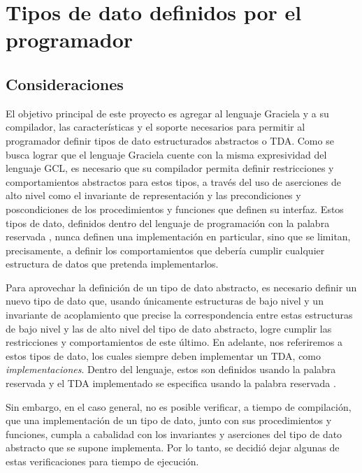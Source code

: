 {{%
\section{Tipos de dato definidos por el programador}


\subsection{Consideraciones}

El objetivo principal de este proyecto es agregar al lenguaje Graciela y a su
compilador, las características y el soporte necesarios para permitir al
programador definir tipos de dato estructurados abstractos o TDA. Como se busca
lograr que el lenguaje Graciela cuente con la misma expresividad del lenguaje
GCL, es necesario que su compilador permita definir restricciones y
comportamientos abstractos para estos tipos, a través del uso de aserciones de
alto nivel como el invariante de representación y las precondiciones y
poscondiciones de los procedimientos y funciones que definen su interfaz.
Estos tipos de dato, definidos dentro del lenguaje de programación con la
palabra reservada , nunca definen una implementación en
particular, sino que se limitan, precisamente, a definir los comportamientos que
debería cumplir cualquier estructura de datos que pretenda implementarlos.

Para aprovechar la definición de un tipo de dato abstracto, es necesario definir
un nuevo tipo de dato que, usando únicamente estructuras de bajo nivel y un
invariante de acoplamiento que precise la correspondencia entre estas
estructuras de bajo nivel y las de alto nivel del tipo de dato abstracto, logre
cumplir las restricciones y comportamientos de este último. En adelante, nos
referiremos a estos tipos de dato, los cuales siempre deben implementar un TDA,
como \textit{implementaciones}. Dentro del lenguaje, estos son definidos usando
la palabra reservada  y el TDA implementado se especifica usando la
palabra reservada .

Sin embargo, en el caso general, no es posible verificar, a tiempo de
compilación, que una implementación de un tipo de dato, junto con sus
procedimientos y funciones, cumpla a cabalidad con los invariantes y aserciones
del tipo de dato abstracto que se supone implementa. Por lo tanto, se decidió
dejar algunas de estas verificaciones para tiempo de ejecución.

}}
